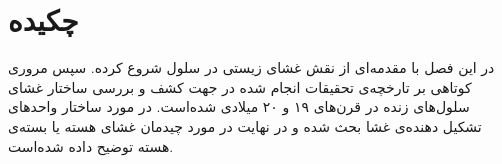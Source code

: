 \setRL
\clearpage

\def \MemBio {\Mempath /MembraneBio}

\section{
چکیده
}
در این فصل با مقدمه‌ای از نقش غشای زیستی در سلول شروع کرده. سپس مروری کوتاهی بر تارخچه‌ی تحقیقات انجام شده در جهت کشف و بررسی ساختار غشای سلول‌های زنده در قرن‌های ۱۹ و ۲۰ میلادی شده‌است. در مورد ساختار واحد‌های تشکیل دهنده‌ی غشا بحث شده و در نهایت در مورد چیدمان غشای هسته یا بسته‌ی هسته توضیح داده شده‌است.




